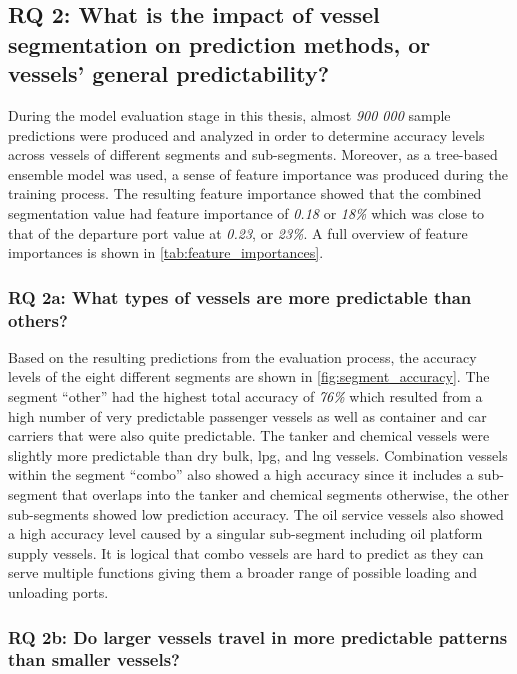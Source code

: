 \subsection{RQ 2: What is the impact of vessel segmentation on prediction methods, or vessels' general predictability?}

During the model evaluation stage in this thesis, almost \textit{900 000} sample predictions were produced and analyzed in order to determine accuracy levels across vessels of different segments and sub-segments. Moreover, as a tree-based ensemble model was used, a sense of feature importance was produced during the training process. The resulting feature importance showed that the combined segmentation value had feature importance of \textit{0.18} or \textit{18\%} which was close to that of the departure port value at \textit{0.23}, or \textit{23\%}. A full overview of feature importances is shown in \cref{tab:feature_importances}.

\subsubsection{RQ 2a: What types of vessels are more predictable than others?}

Based on the resulting predictions from the evaluation process, the accuracy levels of the eight different segments are shown in \cref{fig:segment_accuracy}. The segment ``other'' had the highest total accuracy of \textit{76\%} which resulted from a high number of very predictable passenger vessels as well as container and car carriers that were also quite predictable. The tanker and chemical vessels were slightly more predictable than dry bulk, \acrfull{lpg}, and \acrfull{lng} vessels. Combination vessels within the segment ``combo'' also showed a high accuracy since it includes a sub-segment that overlaps into the tanker and chemical segments otherwise, the other sub-segments showed low prediction accuracy. The oil service vessels also showed a high accuracy level caused by a singular sub-segment including oil platform supply vessels. It is logical that combo vessels are hard to predict as they can serve multiple functions giving them a broader range of possible loading and unloading ports.

\subsubsection{RQ 2b: Do larger vessels travel in more predictable patterns than smaller vessels?}

